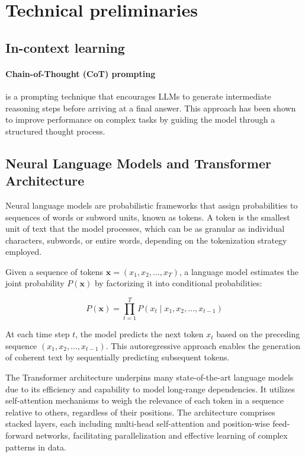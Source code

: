 
\section{Technical preliminaries} \label{app:technicality}

\subsection{In-context learning}

\paragraph{Chain-of-Thought (CoT) prompting} \citep{weiChainofThoughtPromptingElicits2023} is a prompting technique that encourages LLMs to generate intermediate reasoning steps before arriving at a final answer. This approach has been shown to improve performance on complex tasks by guiding the model through a structured thought process.

\subsection{Neural Language Models and Transformer Architecture} \label{app:llm-transformer}

Neural language models are probabilistic frameworks that assign probabilities to sequences of words or subword units, known as tokens. A token is the smallest unit of text that the model processes, which can be as granular as individual characters, subwords, or entire words, depending on the tokenization strategy employed.

Given a sequence of tokens \( \mathbf{x} = (x_1, x_2, \ldots, x_T) \), a language model estimates the joint probability \( P(\mathbf{x}) \) by factorizing it into conditional probabilities:

\[
P(\mathbf{x}) = \prod_{t=1}^T P(x_t \mid x_1, x_2, \ldots, x_{t-1})
\]

At each time step \( t \), the model predicts the next token \( x_t \) based on the preceding sequence \( (x_1, x_2, \ldots, x_{t-1}) \). This autoregressive approach enables the generation of coherent text by sequentially predicting subsequent tokens.

The Transformer architecture underpins many state-of-the-art language models due to its efficiency and capability to model long-range dependencies. It utilizes self-attention mechanisms to weigh the relevance of each token in a sequence relative to others, regardless of their positions. The architecture comprises stacked layers, each including multi-head self-attention and position-wise feed-forward networks, facilitating parallelization and effective learning of complex patterns in data.

